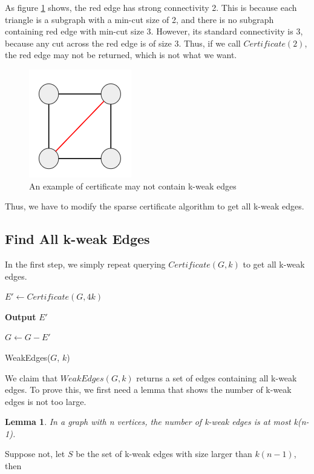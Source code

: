 \documentclass{article}
\newtheorem{lemma}{Lemma}
\begin{document}
As figure \ref{fig:ex_strong} shows, the red edge has strong connectivity 2. This is because each triangle is a subgraph with a min-cut size of 2, and there is no subgraph containing red edge with min-cut size 3.
However, its standard connectivity is 3, because any cut across the red edge is of size 3. Thus, if we call $Certificate(2)$, the red edge may not be returned, which is not what we want.

\begin{figure}[h!]
\centering
\includegraphics[scale=0.4]{images/square_example.png}
\caption{An example of certificate may not contain k-weak edges}
\label{fig:ex_strong}
\end{figure}

Thus, we have to modify the sparse certificate algorithm to get all k-weak edges.

\subsection{Find All k-weak Edges}
In the first step, we simply repeat querying \textbf{$Certificate(G, k)$} to get all k-weak edges.

\begin{algorithm}[H]
\SetAlgoLined

     {
        $E' \gets Certificate(G, 4k)$\;
        
        \textbf{Output} $E'$\;
        
        $G \gets G - E'$\;
    }
        
\caption{WeakEdges($G$, $k$)}
\end{algorithm}

We claim that $Weak Edges(G, k)$ returns a set of edges containing all k-weak edges. 
To prove this, we first need a lemma that shows the number of k-weak edges is not too large.

\begin{lemma} \label{number_k_weak}
In a graph with n vertices, the number of k-weak edges is at most k(n-1).
\end{lemma}
Suppose not, let $S$ be the set of k-weak edges with size larger than $k(n-1)$, then
\end{document}
